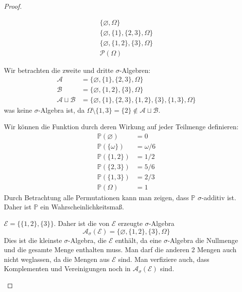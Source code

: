 \begin{proof}
	\begin{parts}
		\item \begin{gather*}
			\{\varnothing, \Omega\}\\
			\{\varnothing, \{1\}, \{2,3\}, \Omega\}\\
			\{\varnothing, \{1,2\}, \{3\},\Omega\}\\
			\mathcal{P}(\Omega)
		\end{gather*}
	\item Wir betrachten die zweite und dritte $\sigma$-Algebren:
	\begin{align*}
		\mathcal{A}&=\{\varnothing, \{1\}, \{2,3\}, \Omega\}\\
		\mathcal{B}&=\{\varnothing, \{1,2\}, \{3\},\Omega\}\\
		\mathcal{A}\sqcup \mathcal{B}&=\{\varnothing, \{1\}, \{2,3\}, \{1,2\}, \{3\}, \{1,3\}, \Omega \}
	\end{align*}
was keine $\sigma$-Algebra ist, da $\Omega \setminus \{1,3\}=\{2\}\not\in \mathcal{A}\sqcup \mathcal{B}$.
\item Wir können die Funktion durch deren Wirkung auf jeder Teilmenge definieren:
\begin{align*}
	\mathbb{P}(\varnothing)&=0\\
	\mathbb{P}(\{\omega\})&=\omega/6\\
	\mathbb{P}(\{1,2\})&=1/2\\
	\mathbb{P}(\{2,3\})&=5/6\\
	\mathbb{P}(\{1,3\})&=2/3\\
	\mathbb{P}(\Omega)&=1
\end{align*}
Durch Betrachtung alle Permutationen kann man zeigen, dass $\mathbb{P}$ $\sigma$-additiv ist. Daher ist $\mathbb{P}$ ein Wahrscheinlichkeitsmaß.
\item $\mathcal{E}=\{\{1,2\},\{3\}\}$. Daher ist die von $\mathcal{E}$ erzeugte $\sigma$-Algebra
\[\mathcal{A}_\sigma(\mathcal{E})=\{\varnothing, \{1,2\}, \{3\}, \Omega\}\]
Dies ist die kleinste $\sigma$-Algebra, die $\mathcal{E}$ enthält, da eine $\sigma$-Algebra die Nullmenge und die gesamte Menge enthalten muss. Man darf die anderen 2 Mengen auch nicht weglassen, da die Mengen aus $\mathcal{E}$ sind. Man verfiziere auch, dass Komplementen und Vereinigungen noch in $\mathcal{A}_\sigma(\mathcal{E})$ sind.\qedhere
	\end{parts}
\end{proof}
